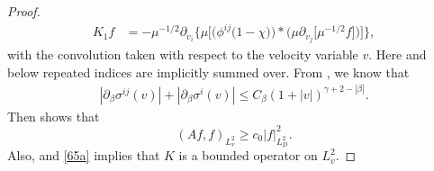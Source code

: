 \documentclass[reqno,a4paper]{amsart}
\numberwithin{equation}{section}
\newcommand{\1}{\mathbf{1}}
\newcommand{\R}{\mathbb{R}}
\newcommand{\<}{\langle}
\renewcommand{\>}{\rangle}
\begin{document}
\begin{proof}
\begin{align*}
	K_1f &=  -\mu^{-1/2}\partial_{v_i}\Big\{\mu\Big[\Big(\phi^{ij}\big(1-\chi\big)\Big)*\Big(\mu\partial_{v_j}\big[\mu^{-1/2}f\big]\Big)\Big]\Big\},
\end{align*}
with the convolution taken with respect to the velocity variable $v$. 
Here and below repeated indices are implicitly summed over. 
From \cite[Lemma 3]{Guo2002a}, we know that  
\begin{align}\label{65a}
	|\partial_\beta\sigma^{ij}(v)|+|\partial_\beta\sigma^i(v)|\le C_\beta(1+|v|)^{\gamma+2-|\beta|}.
\end{align}
Then \cite[(4.33)]{Yang2016} shows that 
\begin{equation*}
	(A f,f)_{L^2_{v}}
	\ge c_0|f|^2_{L^2_{D}}.
\end{equation*}
Also, \cite[(4.32)]{Yang2016} and \eqref{65a} implies that $K$ is a bounded operator on $L^2_v$. 


\end{proof}
\end{document}
